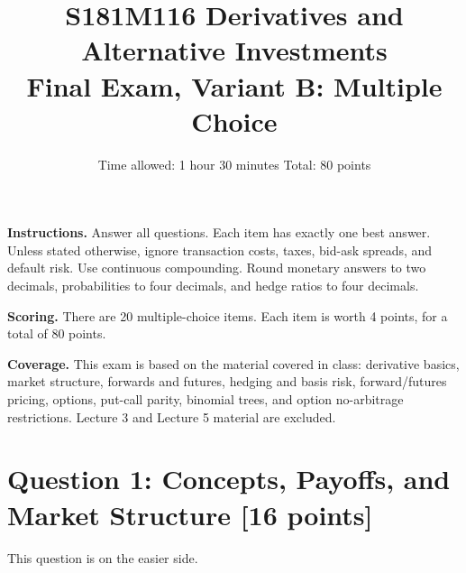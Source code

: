 \documentclass[11pt]{article}
\title{S181M116 Derivatives and Alternative Investments\\
Final Exam, Variant B: Multiple Choice}
\author{Time allowed: 1 hour 30 minutes \qquad Total: 80 points}
\date{}
\newcommand{\pts}[1]{\hspace{0.35em}\textnormal{\textbf{[#1 points]}}}
\begin{document}
\maketitle

\textbf{Instructions.} Answer all questions. Each item has exactly one best
answer. Unless stated otherwise, ignore transaction costs, taxes, bid-ask
spreads, and default risk. Use continuous compounding. Round monetary answers to
two decimals, probabilities to four decimals, and hedge ratios to four decimals.

\textbf{Scoring.} There are 20 multiple-choice items. Each item is worth 4
points, for a total of 80 points.

\textbf{Coverage.} This exam is based on the material covered in class:
derivative basics, market structure, forwards and futures, hedging and basis
risk, forward/futures pricing, options, put-call parity, binomial trees, and
option no-arbitrage restrictions. Lecture 3 and Lecture 5 material are excluded.

\section*{Question 1: Concepts, Payoffs, and Market Structure \pts{16}}

This question is on the easier side.
\end{document}
